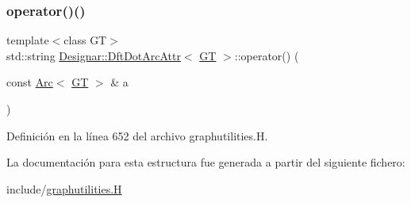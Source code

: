 \subsubsection{\texorpdfstring{operator()()}{operator()()}}
{\footnotesize\ttfamily template$<$class GT$>$ \\
std\+::string \hyperlink{struct_designar_1_1_dft_dot_arc_attr}{Designar\+::\+Dft\+Dot\+Arc\+Attr}$<$ \hyperlink{demo-buildgraph_8_c_a3001c40d2c31ca87ed96cd7d1334a55e}{GT} $>$\+::operator() (\begin{DoxyParamCaption}\item[{const \hyperlink{namespace_designar_a3f55fb5513d62ff47cbc8f72b8e95d6f}{Arc}$<$ \hyperlink{demo-buildgraph_8_c_a3001c40d2c31ca87ed96cd7d1334a55e}{GT} $>$ \&}]{a }\end{DoxyParamCaption})\hspace{0.3cm}{\ttfamily [inline]}}



Definición en la línea 652 del archivo graphutilities.\+H.



La documentación para esta estructura fue generada a partir del siguiente fichero\+:\begin{DoxyCompactItemize}
\item 
include/\hyperlink{graphutilities_8_h}{graphutilities.\+H}\end{DoxyCompactItemize}
